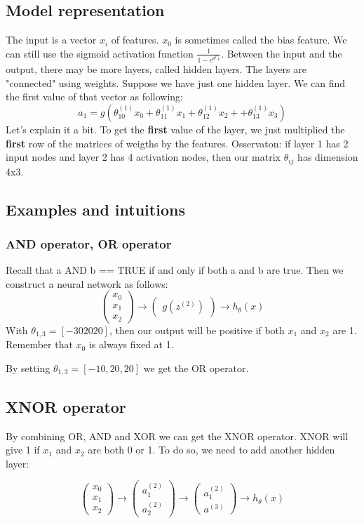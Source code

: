 \documentclass{article}
\begin{document}
\subsection{Model representation}
The input is a vector $x_i$ of features. $x_0$ is sometimes called the bias
feature. We can still use the sigmoid activation function
$\frac{1}{1 - e^{\theta^T x}}$. Between the input and the output, there may be
more layers, called hidden layers. The layers are "connected" using weights.
Suppose we have just one hidden layer. We can find the first value of that
vector as following:
$$ a_1 = g(\theta_{10}^{(1)}x_0 + \theta_{11}^{(1)}x_1 + \theta_{12}^{(1)}x_2 +
          + \theta_{13}^{(1)}x_3)$$
Let's explain it a bit. To get the \textbf{first} value of the layer, we
just multiplied the \textbf{first} row of the matrices of weigths by the features.
Osservaton: if layer 1 has 2 input nodes and layer 2 has 4 activation nodes, then our matrix
$\theta_{ij}$ has dimension 4x3.
\subsection{Examples and intuitions}
\subsubsection{AND operator, OR operator}
Recall that a AND b == TRUE if and only if both a and b are true.
Then we construct a neural network as follows:
$$\begin{pmatrix}x_0\\x_1\\x_2\end{pmatrix} \to
  \begin{pmatrix}g(z^{(2)})\end{pmatrix} \to
  h_\theta(x)$$
With $\theta_{1,3} = [-30 20 20]$, then our output will be positive if both
$x_1$ and $x_2$ are 1. Remember that $x_0$ is always fixed at 1.

By setting $\theta_{1,3} = [-10,20,20]$ we get the OR operator.

\subsection{XNOR operator}
By combining OR, AND and XOR we can get the XNOR operator. XNOR will give 1 if
$x_1$ and $x_2$ are both 0 or 1. To do so, we need to
add another hidden layer:

$$\begin{pmatrix}x_0\\x_1\\x_2\end{pmatrix} \to
  \begin{pmatrix}a_1^{(2)}\\a_2^{(2)}\end{pmatrix} \to
  \begin{pmatrix}a_1^{(2)}\\a^{(3)}\end{pmatrix} \to
  h_\theta(x)$$
\end{document}
